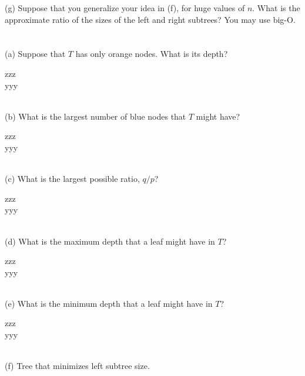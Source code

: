 \documentclass[12pt]{article}
\begin{document}
\begin{enumerate}
(g) Suppose that you generalize your idea in (f), for huge values of $n$.  What is the approximate ratio of the sizes of the left and right subtrees?  You may use big-O. \\\\\\




\newpage
(a) Suppose that $T$ has only orange nodes. What is its depth?


{\color{blue}
zzz\\
yyy\\\\
}




(b) What is the largest number of blue nodes that $T$ might have?


{\color{blue}
zzz\\
yyy\\\\
}




(c) %
 What is the largest possible ratio,  $q / p$?


{\color{blue}
zzz\\
yyy\\\\
}




(d) What is the maximum depth that a leaf might have in $T$?


{\color{blue}
zzz\\
yyy\\\\
}






(e) What is the minimum depth that a leaf might have in $T$?


{\color{blue}
zzz\\
yyy\\\\
}




(f)  Tree that minimizes left subtree size.



\end{enumerate}
\end{document}
